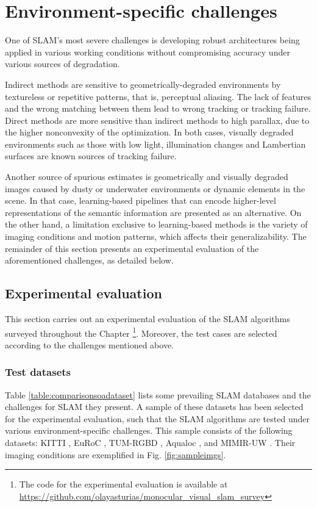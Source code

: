 

\section{Environment-specific challenges}
\label{sec:environment}
One of SLAM’s most severe challenges is developing robust architectures
being applied in various working conditions without compromising accuracy under various sources of degradation. 

Indirect methods are sensitive to geometrically-degraded environments by textureless or repetitive patterns, that is, perceptual aliasing. 
The lack of features and the wrong matching between them lead to wrong tracking or tracking failure. Direct methods are more sensitive than indirect methods to high parallax, due to the higher nonconvexity of the optimization. In both cases, visually degraded environments such as those with low light, illumination changes and Lambertian surfaces are known sources of tracking failure. 

Another source of spurious estimates is geometrically and visually degraded images caused by dusty or underwater environments or dynamic elements in the scene. In that case, learning-based pipelines that can encode higher-level representations of the semantic information are presented as an alternative. On the other hand, a limitation exclusive to learning-based methods is the variety of imaging conditions and motion patterns, which affects their generalizability. The remainder of this section presents an experimental evaluation of the aforementioned challenges, as detailed below.

\subsection{Experimental evaluation}
This section carries out an experimental evaluation of the SLAM algorithms surveyed throughout the Chapter \footnote{The code for the experimental evaluation is available at \url{https://github.com/olayasturias/monocular_visual_slam_survey}}. Moreover, the test cases are selected according to the challenges mentioned above. 


\subsubsection{Test datasets}
Table \ref{table:comparisonsoadataset} lists some prevailing SLAM databases and the challenges for SLAM they present. A sample of these datasets has been selected for the experimental evaluation, such that the SLAM algorithms are tested under various environment-specific challenges. This sample consists of the following datasets: KITTI \cite{dataset:kitti}, EuRoC \cite{dataset:burri2016euroc}, TUM-RGBD \cite{sturm2012tumrgbd}, Aqualoc \cite{dataset:aqualocdb}, and MIMIR-UW \cite{dataset:mimir}. Their imaging conditions are exemplified in Fig. \ref{fig:sampleimgs}.

